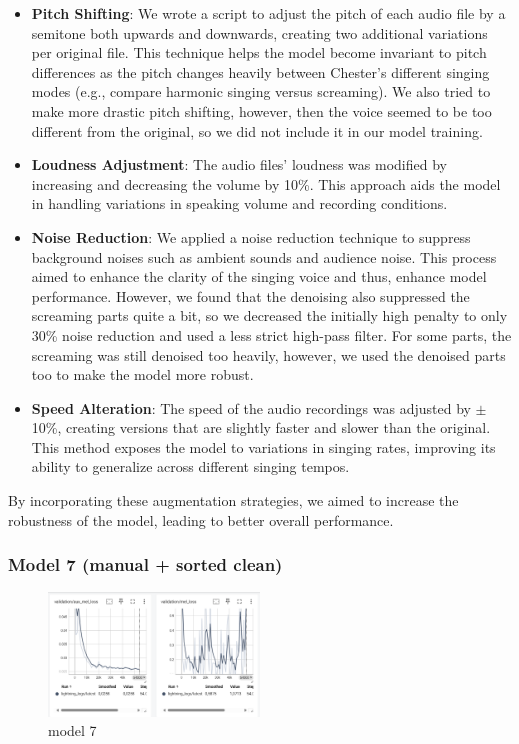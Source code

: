 \documentclass[a4paper]{article}
\begin{document}
\begin{itemize}
    \item \textbf{Pitch Shifting}: We wrote a script to adjust the pitch of each audio file by a semitone both upwards and downwards, creating two additional variations per original file. This technique helps the model become invariant to pitch differences as the pitch changes heavily between Chester’s different singing modes (e.g., compare harmonic singing versus screaming). We also tried to make more drastic pitch shifting, however, then the voice seemed to be too different from the original, so we did not include it in our model training.

    \item \textbf{Loudness Adjustment}: The audio files’ loudness was modified by increasing and decreasing the volume by 10\%. This approach aids the model in handling variations in speaking volume and recording conditions.

    \item \textbf{Noise Reduction}: We applied a noise reduction technique to suppress background noises such as ambient sounds and audience noise. This process aimed to enhance the clarity of the singing voice and thus, enhance model performance. However, we found that the denoising also suppressed the screaming parts quite a bit, so we decreased the initially high penalty to only 30\% noise reduction and used a less strict high-pass filter. For some parts, the screaming was still denoised too heavily, however, we used the denoised parts too to make the model more robust.

    \item \textbf{Speed Alteration}: The speed of the audio recordings was adjusted by $\pm$10\%, creating versions that are slightly faster and slower than the original. This method exposes the model to variations in singing rates, improving its ability to generalize across different singing tempos.
\end{itemize}

By incorporating these augmentation strategies, we aimed to increase the robustness of the model, leading to better overall performance.


\subsubsection{Model 7 (manual + sorted clean)}

\begin{figure}[htbp]
    \centering
    \includegraphics[width=0.5\textwidth]{graphics/v7_testing.png}
    \caption{model 7}
    \label{fig:bild4}
\end{figure}
\end{document}

